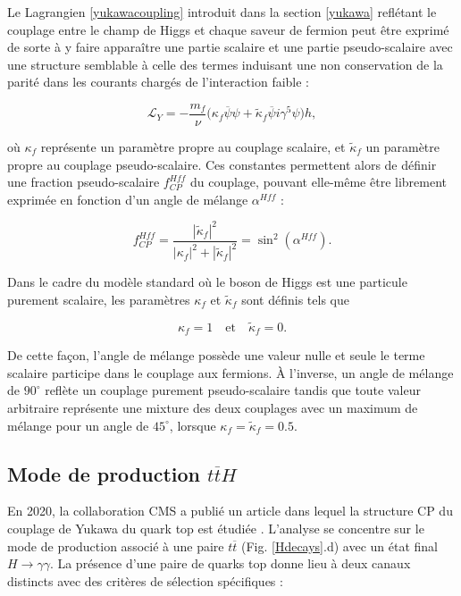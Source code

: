 Le Lagrangien \ref{yukawacoupling} introduit dans la section \ref{yukawa} reflétant le couplage entre le champ de Higgs et chaque saveur de fermion peut être exprimé de sorte à y faire apparaître une partie scalaire et une partie pseudo-scalaire avec une structure semblable à celle des termes induisant une non conservation de la parité dans les courants chargés de l'interaction faible :

    \begin{equation}
        \mathcal{L}_Y = -\frac{m_f}{\nu}\bigl(\kappa_f\overline{\psi}\psi+\tilde{\kappa}_f\overline{\psi}i\gamma^5\psi\bigr)h,
    \end{equation}

    où $\kappa_f$ représente un paramètre propre au couplage scalaire, et $\tilde{\kappa}_f$ un paramètre propre au couplage pseudo-scalaire. Ces constantes permettent alors de définir une fraction pseudo-scalaire $f^{Hff}_{CP}$ du couplage, pouvant elle-même être librement exprimée en fonction d'un angle de mélange $\alpha^{Hff}$ :

    \begin{equation}
        f^{Hff}_{CP}=\frac{|\tilde{\kappa}_f|^2}{|\kappa_f|^2+|\tilde{\kappa}_f|^2}=\sin^2(\alpha^{Hff}).
    \end{equation}

    Dans le cadre du modèle standard où le boson de Higgs est une particule purement scalaire, les paramètres $\kappa_f$ et $\tilde{\kappa}_f$ sont définis tels que 

    \begin{equation*}
    \boxed{
        \kappa_f=1 \quad \mbox{et} \quad \tilde{\kappa}_f=0.
    }
    \end{equation*}

    De cette façon, l'angle de mélange possède une valeur nulle et seule le terme scalaire participe dans le couplage aux fermions. À l'inverse, un angle de mélange de $90^\circ$ reflète un couplage purement pseudo-scalaire tandis que toute valeur arbitraire représente une mixture des deux couplages avec un maximum de mélange pour un angle de $45^\circ$, lorsque $\kappa_f=\tilde{\kappa}_f=0.5$. \\

    \subsection{Mode de production $t\overline{t}H$}

    En 2020, la collaboration CMS a publié un article dans lequel la structure CP du couplage de Yukawa du quark top est étudiée \cite{ttH}. L'analyse se concentre sur le mode de production associé à une paire $t\overline{t}$ (Fig. \ref{Hdecays}.d) avec un état final $H\rightarrow\gamma\gamma$. La présence d'une paire de quarks top donne lieu à deux canaux distincts avec des critères de sélection spécifiques :

